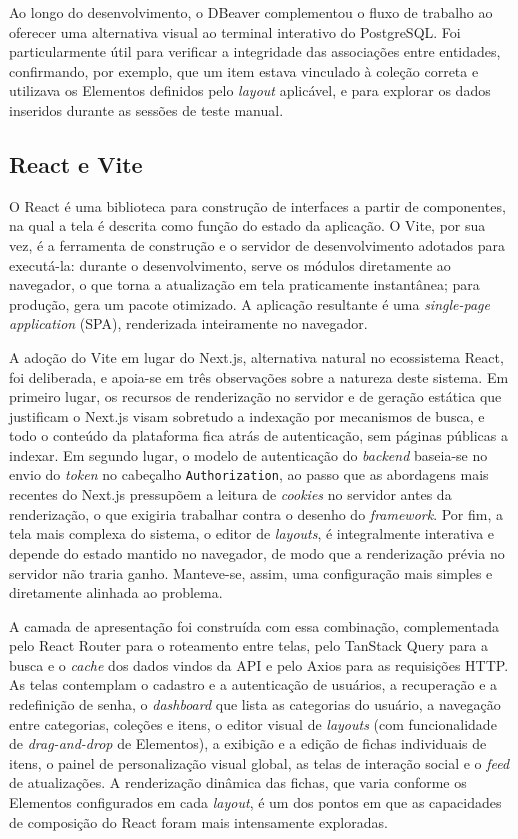 Ao longo do desenvolvimento, o DBeaver complementou o fluxo de trabalho ao oferecer uma alternativa visual ao terminal interativo do PostgreSQL. Foi particularmente útil para verificar a integridade das associações entre entidades, confirmando, por exemplo, que um item estava vinculado à coleção correta e utilizava os Elementos definidos pelo \textit{layout} aplicável, e para explorar os dados inseridos durante as sessões de teste manual.

\subsection{React e Vite}

O React é uma biblioteca para construção de interfaces a partir de componentes, na qual a tela é descrita como função do estado da aplicação. O Vite, por sua vez, é a ferramenta de construção e o servidor de desenvolvimento adotados para executá-la: durante o desenvolvimento, serve os módulos diretamente ao navegador, o que torna a atualização em tela praticamente instantânea; para produção, gera um pacote otimizado. A aplicação resultante é uma \textit{single-page application} (SPA), renderizada inteiramente no navegador.

A adoção do Vite em lugar do Next.js, alternativa natural no ecossistema React, foi deliberada, e apoia-se em três observações sobre a natureza deste sistema. Em primeiro lugar, os recursos de renderização no servidor e de geração estática que justificam o Next.js visam sobretudo a indexação por mecanismos de busca, e todo o conteúdo da plataforma fica atrás de autenticação, sem páginas públicas a indexar. Em segundo lugar, o modelo de autenticação do \textit{backend} baseia-se no envio do \textit{token} no cabeçalho \texttt{Authorization}, ao passo que as abordagens mais recentes do Next.js pressupõem a leitura de \textit{cookies} no servidor antes da renderização, o que exigiria trabalhar contra o desenho do \textit{framework}. Por fim, a tela mais complexa do sistema, o editor de \textit{layouts}, é integralmente interativa e depende do estado mantido no navegador, de modo que a renderização prévia no servidor não traria ganho. Manteve-se, assim, uma configuração mais simples e diretamente alinhada ao problema.

A camada de apresentação foi construída com essa combinação, complementada pelo React Router para o roteamento entre telas, pelo TanStack Query para a busca e o \textit{cache} dos dados vindos da API e pelo Axios para as requisições HTTP. As telas contemplam o cadastro e a autenticação de usuários, a recuperação e a redefinição de senha, o \textit{dashboard} que lista as categorias do usuário, a navegação entre categorias, coleções e itens, o editor visual de \textit{layouts} (com funcionalidade de \textit{drag-and-drop} de Elementos), a exibição e a edição de fichas individuais de itens, o painel de personalização visual global, as telas de interação social e o \textit{feed} de atualizações. A renderização dinâmica das fichas, que varia conforme os Elementos configurados em cada \textit{layout}, é um dos pontos em que as capacidades de composição do React foram mais intensamente exploradas.


